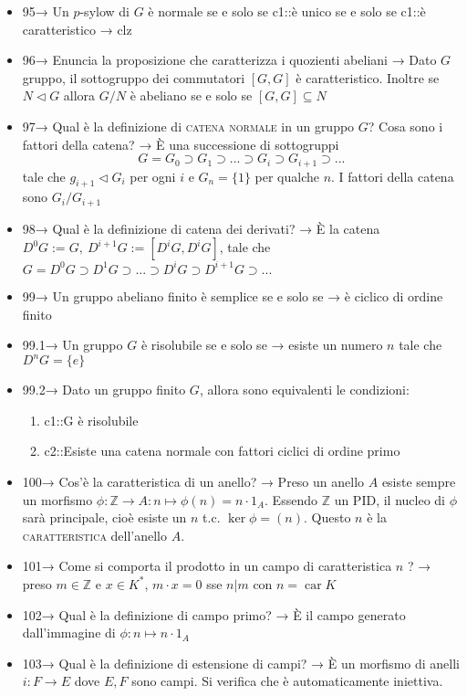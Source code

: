 \documentclass[A4,12pt]{article}
\newcommand{\Z}{\mathbb{Z}}
\renewcommand{\subset}{\subseteq}
\newcommand{\psy}{$ p $-sylow }
\begin{document}
\begin{itemize}[noitemsep]
		\item 95→ Un \psy di $ G $ è normale se e solo se {{c1::è unico }} se e solo se {{c1::è caratteristico}} → clz
		\item 96→ Enuncia la proposizione che caratterizza i quozienti abeliani → Dato $ G $ gruppo, il sottogruppo dei commutatori $ [G,G] $ è caratteristico. Inoltre se $ N\lhd G $ allora $ G/N $ è abeliano se e solo se $ [G,G]\subset N $
		\item 97→ Qual è la definizione di \textsc{catena normale} in un gruppo $ G $? Cosa sono i fattori della catena? → È una successione di sottogruppi \[G=G_0 \supset G_1\supset ...\supset G_i\supset G_{i+1}\supset ...\] tale che $ g_{i+1}\lhd G_i$ per ogni $ i $ e $ G_n=\{1\} $ per qualche $ n $. I fattori della catena sono $ G_i/G_{i+1} $
		\item 98→ Qual è la definizione di catena dei derivati? → È la catena $ D^0G:=G,\ D^{i+1}G:=[D^iG,D^iG] $, tale che $ G=D^0G\supset D^1 G\supset...\supset D^i G\supset D^{i+1}G\supset ... $
		\item 99→ Un gruppo abeliano finito è semplice se e solo se → è ciclico di ordine finito
        \item 99.1→ Un gruppo $ G $ è risolubile se e solo se → esiste un numero $ n $ tale che $ D^nG = \{e\}$
		\item 99.2→ Dato un gruppo finito $ G $, allora sono equivalenti le condizioni: \begin{enumerate}
			\item {{c1::G è risolubile}}
			\item {{c2::Esiste una catena normale con fattori ciclici di ordine primo}}
		\end{enumerate}
		\item 100→ Cos'è la caratteristica di un anello? → Preso un anello $ A $ esiste sempre un morfismo $ \phi:\Z \to A: n\mapsto \phi(n) = n\cdot 1_A $. Essendo $ \Z $ un PID, il nucleo di $ \phi $ sarà principale, cioè esiste un $ n $ t.c. $ \ker\phi= (n) $. Questo $ n $ è la \textsc{caratteristica} dell'anello $ A $.
		\item 101→ Come si comporta il prodotto in un campo di caratteristica $ n $ ? → preso $ m\in \Z $ e $ x\in K^* $, $ m\cdot x  = 0$ sse $ n|m $ con $ n = \operatorname{car}K$ 
		\item 102→ Qual è la definizione di campo primo? → È il campo generato dall'immagine di $ \phi:n\mapsto n\cdot 1_A $
		\item 103→ Qual è la definizione di estensione di campi? → È un morfismo di anelli $ i:F\to E $ dove $ E,F $ sono campi. Si verifica che è automaticamente iniettiva.

\end{itemize}
\end{document}
